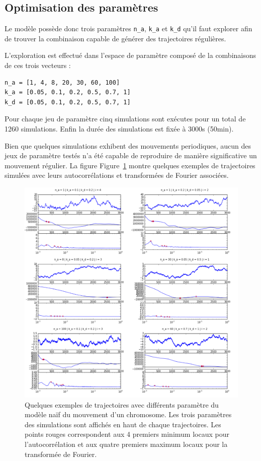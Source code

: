 \documentclass[12pt,a4paper,twoside,openright]{book}
\begin{document}
\subsection{Optimisation des
paramètres}\label{optimisation-des-paramuxe8tres}

Le modèle possède donc trois paramètres \texttt{n\_a}, \texttt{k\_a} et
\texttt{k\_d} qu'il faut explorer afin de trouver la combinaison capable
de générer des trajectoires régulières.

L'exploration est effectué dans l'espace de paramètre composé de la
combinaisons de ces trois vecteurs :

\begin{verbatim}
n_a = [1, 4, 8, 20, 30, 60, 100]
k_a = [0.05, 0.1, 0.2, 0.5, 0.7, 1]
k_d = [0.05, 0.1, 0.2, 0.5, 0.7, 1]
\end{verbatim}

Pour chaque jeu de paramètre cinq simulations sont exécutes pour un
total de 1260 simulations. Enfin la durée des simulations est fixée à
3000s (50min).

Bien que quelques simulations exhibent des mouvements periodiques, aucun
des jeux de paramètre testés n'a été capable de reproduire de manière
significative un mouvement régulier. La figure
Figure~\ref{fig:simu-oscill-all} montre quelques exemples de
trajectoires simulées avec leurs autocorrélations et transformées de
Fourier associées.

\begin{figure}[htbp]
\centering
\includegraphics{figures/annexes/simu_oscill_all.png}
\caption{\label{fig:simu-oscill-all}Quelques exemples de trajectoires
avec différents paramètre du modèle naïf du mouvement d'un chromosome.
Les trois paramètres des simulations sont affichés en haut de chaque
trajectoires. Les points rouges correspondent aux 4 premiers minimum
locaux pour l'autocorrélation et aux quatre premiers maximum locaux pour
la transformée de Fourier.}
\end{figure}
\end{document}

